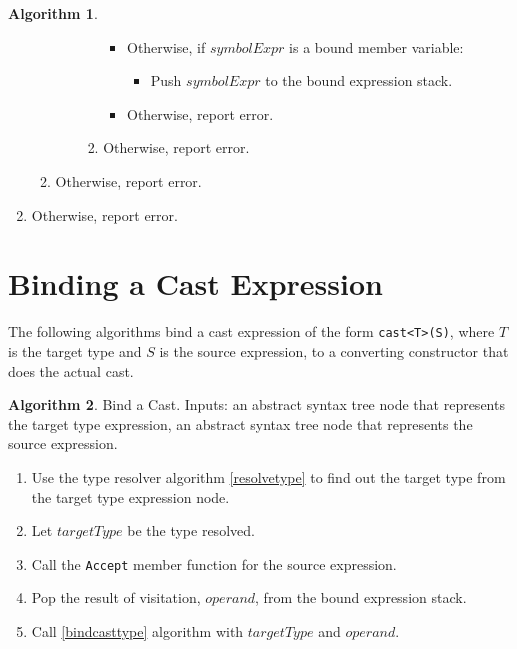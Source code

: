 \documentclass[a4paper,oneside,11pt]{book}
\theoremstyle{definition}
\newtheorem{algo}{Algorithm}[section]
\begin{document}
\begin{algo}
\begin{enumerate}
\begin{enumerate}
\begin{enumerate}
\begin{enumerate}
\begin{itemize}
\item
Otherwise, if $symbolExpr$ is a bound member variable:
\begin{itemize}
\item
Push $symbolExpr$ to the bound expression stack.
\end{itemize}
\item
Otherwise, report error.
\end{itemize}
\item
Otherwise, report error.
\end{enumerate}
\end{enumerate}
\item
Otherwise, report error.
\end{enumerate}
\item
Otherwise, report error.
\end{enumerate}
\end{algo}

\section{Binding a Cast Expression}

The following algorithms bind a cast expression of the form \verb|cast<T>(S)|, where $T$ is the target type and $S$ is the source expression,
to a converting constructor that does the actual cast.

\begin{algo}\label{bindcast} Bind a Cast.
Inputs: an abstract syntax tree node that represents the target type expression, an abstract syntax tree node that represents the source expression.
\begin{enumerate}
\item
Use the type resolver algorithm \ref{resolvetype} to find out the target type from the target type expression node.
\item
Let $targetType$ be the type resolved.
\item
Call the \verb|Accept| member function for the source expression.
\item
Pop the result of visitation, $operand$, from the bound expression stack.
\item
Call \ref{bindcasttype} algorithm with $targetType$ and $operand$.
\end{enumerate}
\end{algo}
\end{document}
